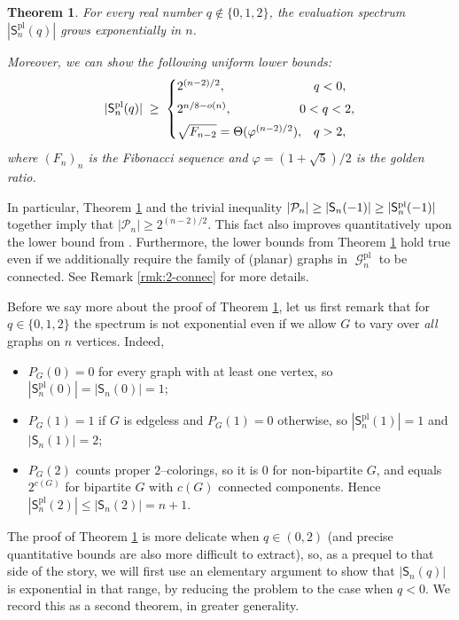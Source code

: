 \documentclass[A4paper,reqno,oneside,12pt]{amsart}
\theoremstyle{plain}
\newtheorem{theorem}{Theorem}[section]
\theoremstyle{definition}
\newcommand{\abs}[1]{\left| #1 \right|}
\DeclareMathOperator{\pl}{\mathrm{pl}}
\DeclareMathOperator{\mG}{\mathcal{G}}
\begin{document}
\begin{theorem}\label{thm:planar}
For every real number $q\notin\{0,1,2\}$,
the evaluation spectrum $|\mathsf{S}_n^{\pl}(q)|$ grows exponentially in $n$. 

Moreover, we can show the following uniform lower bounds: 
\[
|\mathsf{S}^{\pl}_n(q)| \;\ge\;
\begin{cases}
2^{(n-2)/2}, & q<0,\\[4pt]
2^{n/8 - o(n)}, & \hspace{-4mm} 0 < q < 2,\\[4pt]
\sqrt{F_{n-2}}= \Theta(\varphi^{(n-2)/2}), & q>2,\
\end{cases}
\]
where $(F_n)_n$ is the Fibonacci sequence and $\varphi = (1+\sqrt{5})/2$ is the golden ratio.
\end{theorem}

In particular, Theorem \ref{thm:planar} and the trivial inequality $|\mathcal{P}_n| \geq \abs{\mathsf{S}_n(-1)} \geq \abs{\smash{\mathsf{S}_n^{\pl}}(-1)}$ together imply that $|\mathcal{P}_n| \geq 2^{(n-2)/2}$. This fact also improves quantitatively upon the lower bound from \cite{AKFlow}. Furthermore, the lower bounds from Theorem \ref{thm:planar} hold true even if we additionally require the family of (planar) graphs in $\mG_n^{\pl}$ to be connected. See Remark \ref{rmk:2-connec} for more details. 


Before we say more about the proof of Theorem \ref{thm:planar}, let us first remark that for $q\in\{0,1,2\}$ the spectrum is not exponential even if we allow $G$ to vary over {\it{all}} graphs on $n$ vertices.
Indeed,
\begin{itemize}
\item $P_G(0)=0$ for every graph with at least one vertex, so $|\mathsf{S}^{\pl}_n(0)|=|\mathsf{S}_n(0)|=1$;
\item $P_G(1)=1$ if $G$ is edgeless and $P_G(1)=0$ otherwise, so $|\mathsf{S}^{\pl}_n(1)|=1$ and $|\mathsf{S}_n(1)|= 2$;
\item $P_G(2)$ counts proper $2$--colorings, so it is $0$ for non-bipartite $G$, and equals $2^{c(G)}$ for bipartite $G$ with $c(G)$ connected components.
Hence $|\mathsf{S}^{\pl}_n(2)|\leq |\mathsf{S}_n(2)|= n+1$.
\end{itemize}

The proof of Theorem \ref{thm:planar} is more delicate when $q \in (0,2)$ (and precise quantitative bounds are also more difficult to extract), so, as a prequel to that side of the story, we will first use an elementary argument to show that $|\mathsf{S}_n(q)|$ is exponential in that range, by reducing the problem to the case when $q < 0$. We record this as a second theorem, in greater generality. 
\end{document}
